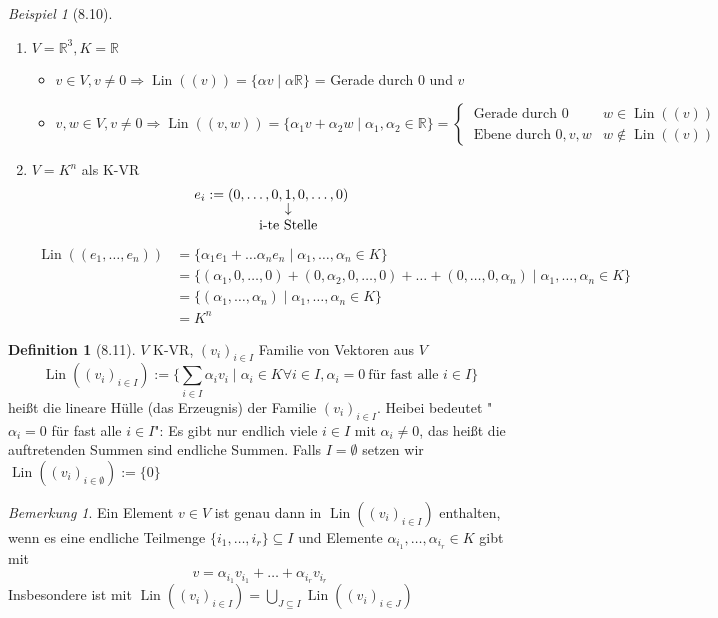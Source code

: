 \documentclass[a4paper]{scrartcl}
\DeclareMathOperator{\Forall}{\forall}
\DeclareMathOperator{\Lin}{Lin}
\theoremstyle{definition}
\newtheorem{defn}{Definition}
\theoremstyle{plain}
\theoremstyle{plain}
\theoremstyle{remark}
\newtheorem{remark}{Bemerkung}
\theoremstyle{remark}
\theoremstyle{remark}
\newtheorem{ex}{Beispiel}
\begin{document}
\begin{ex}[8.10]
\mbox{}
\begin{enumerate}
\item $V = \mathbb{R}^3, K = \mathbb{R}$
\begin{itemize}
\item $v \in V, v \neq 0 \Rightarrow \Lin((v)) = \{\alpha v \mid \alpha \mathbb{R}\}$ = Gerade durch $0$ und $v$
\item \[v,w \in V, v \neq 0 \Rightarrow \Lin((v,w)) = \{\alpha_1 v + \alpha_2 w \mid \alpha_1, \alpha_2 \in \mathbb{R}\} = \begin{cases} ~\text{Gerade durch $0$} & w \in \Lin((v)) \\ ~\text{Ebene durch $0,v,w$} & w\not\in \Lin((v)) \end{cases}\]
\end{itemize}
\item $V = K^n$ als K-VR \\
     \[e_i := (0, \ldots, 0, \underarrow[1]{i-te Stelle}, 0, \ldots, 0)\]
\begin{align*}
\Lin((e_1, \ldots, e_n)) &= \{\alpha_1 e_1 + \ldots \alpha_n e_n \mid \alpha_1, \ldots, \alpha_n \in K \} \\
&= \{(\alpha_1, 0, \ldots, 0) + (0, \alpha_2, 0, \ldots, 0) + \ldots + (0, \ldots, 0, \alpha_n) \mid \alpha_1, \ldots, \alpha_n \in K\} \\
&= \{(\alpha_1, \ldots, \alpha_n) \mid \alpha_1, \ldots, \alpha_n \in K\} \\
&= K^n
\end{align*}
\end{enumerate}
\end{ex}
\begin{defn}[8.11]
$V$ K-VR, $(v_i)_{i\in I}$ Familie von Vektoren aus $V$
\[\Lin((v_i)_{i \in I}) := \{\sum_{i\in I} \alpha_i v_i \mid \alpha_i \in K \Forall i\in I, \alpha_i = 0 ~\text{für fast alle $i\in I$}\}\]
heißt die lineare Hülle (das Erzeugnis) der Familie $(v_i)_{i \in I}$. Heibei bedeutet "$\alpha_i = 0$ für fast alle $i\in I$": Es gibt nur endlich viele $i\in I$ mit $\alpha_i \neq 0$,
das heißt die auftretenden Summen sind endliche Summen. Falls $I = \emptyset$ setzen wir $\Lin((v_i)_{i\in\emptyset}) := \{0\}$
\end{defn}
\begin{remark}
Ein Element $v \in V$ ist genau dann in $\Lin((v_i)_{i\in I})$ enthalten, wenn es eine endliche Teilmenge $\{i_1, \ldots, i_r\} \subseteq I$ und Elemente $\alpha_{i_1}, \ldots, \alpha_{i_r} \in K$ gibt mit
\[v = \alpha_{i_1} v_{i_1} + \ldots + \alpha_{i_r} v_{i_r}\]
Insbesondere ist mit $\Lin((v_i)_{i\in I}) = \bigcup_{J\subseteq I} \Lin((v_i)_{i\in J})$
\end{remark}
\end{document}
